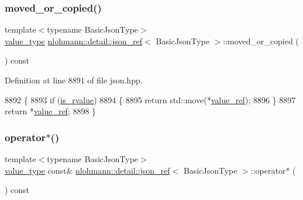 \subsubsection{\texorpdfstring{moved\+\_\+or\+\_\+copied()}{moved\_or\_copied()}}
{\footnotesize\ttfamily template$<$typename Basic\+Json\+Type$>$ \\
\hyperlink{classnlohmann_1_1detail_1_1json__ref_a78d76cf288141049568c0d670ed670ef}{value\+\_\+type} \hyperlink{classnlohmann_1_1detail_1_1json__ref}{nlohmann\+::detail\+::json\+\_\+ref}$<$ Basic\+Json\+Type $>$\+::moved\+\_\+or\+\_\+copied (\begin{DoxyParamCaption}{ }\end{DoxyParamCaption}) const\hspace{0.3cm}{\ttfamily [inline]}}



Definition at line 8891 of file json.\+hpp.


\begin{DoxyCode}
8892     \{
8893         \textcolor{keywordflow}{if} (\hyperlink{classnlohmann_1_1detail_1_1json__ref_a434d1e18c21cc1b61954ba22b62ee7a5}{is\_rvalue})
8894         \{
8895             \textcolor{keywordflow}{return} std::move(*\hyperlink{classnlohmann_1_1detail_1_1json__ref_a23504615c2076070d5e087443bb376a4}{value\_ref});
8896         \}
8897         \textcolor{keywordflow}{return} *\hyperlink{classnlohmann_1_1detail_1_1json__ref_a23504615c2076070d5e087443bb376a4}{value\_ref};
8898     \}
\end{DoxyCode}
\mbox{\label{classnlohmann_1_1detail_1_1json__ref_aa3100e41472dba02ab78ccc1607e44ab}} 
\subsubsection{\texorpdfstring{operator$\ast$()}{operator*()}}
{\footnotesize\ttfamily template$<$typename Basic\+Json\+Type$>$ \\
\hyperlink{classnlohmann_1_1detail_1_1json__ref_a78d76cf288141049568c0d670ed670ef}{value\+\_\+type} const\& \hyperlink{classnlohmann_1_1detail_1_1json__ref}{nlohmann\+::detail\+::json\+\_\+ref}$<$ Basic\+Json\+Type $>$\+::operator$\ast$ (\begin{DoxyParamCaption}{ }\end{DoxyParamCaption}) const\hspace{0.3cm}{\ttfamily [inline]}}



